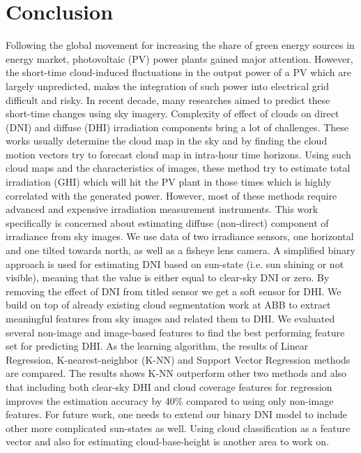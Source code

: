 \chapter{Conclusion}
\label{sec:conclusion_chapter}
Following the global movement for increasing the share of green energy sources in energy market, photovoltaic (PV) power plants gained major attention. However, the short-time cloud-induced fluctuations in the output power of a PV which are largely unpredicted, makes the integration of such power into electrical grid difficult and risky. In recent decade, many researches aimed to predict these short-time changes using sky imagery. Complexity of effect of clouds on direct (DNI) and diffuse (DHI) irradiation components bring a lot of challenges. These works usually determine the cloud map in the sky and by finding the cloud motion vectors try to forecast cloud map in intra-hour time horizons. Using such cloud maps and the characteristics of images, these method try to estimate total irradiation (GHI) which will hit the PV plant in those times which is highly correlated with the generated power. However, most of these methods require advanced and expensive irradiation measurement instruments.
\newline
This work specifically is concerned about estimating diffuse (non-direct) component of irradiance from sky images. We use data of two irradiance sensors, one horizontal and one tilted towards north, as well as a fisheye lens camera. A simplified binary approach is used for estimating DNI based on sun-state (i.e. sun shining or not visible), meaning that the value is either equal to clear-sky DNI or zero. By removing the effect of DNI from titled sensor we get a soft sensor for DHI. We build on top of already existing cloud segmentation work at ABB to extract meaningful features from sky images and related them to DHI. We evaluated several non-image and image-based features to find the best performing feature set for predicting DHI. As the learning algorithm, the results of Linear Regression, K-nearest-neighbor (K-NN) and Support Vector Regression methods are compared. The results shows K-NN outperform other two methods and also that including both clear-sky DHI and cloud coverage features for regression improves the estimation accuracy by 40\% compared to using only non-image features. 
\newline
For future work, one needs to extend our binary DNI model to include other more complicated sun-states as well. Using cloud classification as a feature vector and also for estimating cloud-base-height is another area to work on.
